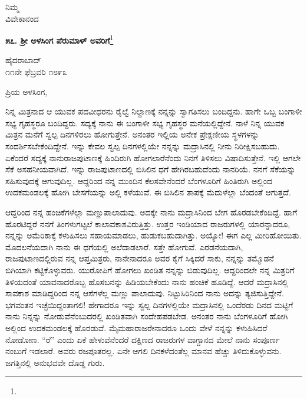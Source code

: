 \vspace{-0.45cm}

{\flushright
ನಿಮ್ಮ\\ವಿವೇಕಾನಂದ\par}

\begin{center}
\textbf{೫೭. ಶ‍್ರೀ ಅಳಸಿಂಗ ಪೆರುಮಾಳ್ ಅವರಿಗೆ}\footnote{}
\end{center}

\vspace{-0.45cm}

\begin{flushright}
ಹೈದರಾಬಾದ್\\೧೧ನೇ ಫೆಬ್ರವರಿ ೧೮೯೩
\end{flushright}

\noindent
ಪ್ರಿಯ ಅಳಸಿಂಗ,

ನಿನ್ನ ಮಿತ್ರನಾದ ಆ ಯುವಕ ಪದವೀಧರನು ರೈಲ್ವೆ ನಿಲ್ದಾಣಕ್ಕೆ ನನ್ನನ್ನು ಸ್ವಾಗತಿಸಲು ಬಂದಿದ್ದನು. ಹಾಗೇ ಒಬ್ಬ ಬಂಗಾಳೀ ಸಭ್ಯ ಗೃಹಸ್ಥರೂ ಬಂದಿದ್ದರು. ಸದ್ಯಕ್ಕೆ ನಾನು ಈ ಬಂಗಾಳೀ ಸಭ್ಯ ಗೃಹಸ್ಥರ ಮನೆಯಲ್ಲಿದ್ದೇನೆ. ನಾಳೆ ನಿನ್ನ ಯುವಕ ಮಿತ್ರನ ಮನೆಗೆ ಸ್ವಲ್ಪ ದಿನಗಳಿರಲು ಹೋಗುತ್ತೇನೆ. ಅನಂತರ ಇಲ್ಲಿಯ ಅನೇಕ ಪ್ರೇಕ್ಷಣೀಯ ಸ್ಥಳಗಳನ್ನು ಸಂದರ್ಶಿಸಬೇಕೆಂದಿದ್ದೇನೆ. ಇನ್ನು ಕೇವಲ ಸ್ವಲ್ಪ ದಿನಗಳಲ್ಲಿಯೇ ನನ್ನನ್ನು ಮದ್ರಾಸಿನಲ್ಲಿ ನೀನು ನಿರೀಕ್ಷಿಸಬಹುದು. ಏಕೆಂದರೆ ಸದ್ಯಕ್ಕೆ ನಾನುರಾಜಪುಟಾಣಕ್ಕೆ ಹಿಂದಿರುಗಿ ಹೋಗಲಾರೆನೆಂದು ನಿನಗೆ ತಿಳಿಸಲು ವಿಷಾದಿಸುತ್ತೇನೆ. ಇಲ್ಲಿ ಆಗಲೇ ಸೆಕೆ ಅಸಹನೀಯವಾಗಿದೆ. ಇನ್ನು ರಾಜಪುಟಾಣದಲ್ಲಿ ಬಿಸಿಲಿನ ಧಗೆ ಹೇಗಿರಬಹುದೆಂದು ನಾನರಿಯೆ. ನನಗೆ ಸೆಕೆಯನ್ನು ಸಹಿಸುವುದಕ್ಕೆ ಆಗುವುದಿಲ್ಲ. ಆದ್ದರಿಂದ ನನ್ನ ಮುಂದಿನ ಕೆಲಸವೇನೆಂದರೆ ಬೆಂಗಳೂರಿಗೆ ಹಿಂತಿರುಗಿ ಅಲ್ಲಿಂದ ಉದಕಮಂಡಲಕ್ಕೆ ಹೋಗಿ ಬೇಸಗೆಯನ್ನು ಅಲ್ಲಿ ಕಳೆಯುವೆ. ಈ ಬಿಸಿಲಿನ ತಾಪಕ್ಕೆ ಮೆದುಳೆಲ್ಲಾ ಬೆಂದಂತೆ ಆಗುತ್ತದೆ.

ಆದ್ದರಿಂದ ನನ್ನ ಹಂಚಿಕೆಗಳೆಲ್ಲಾ ಮಣ್ಣುಪಾಲಾದುವು. ಅದಕ್ಕೇ ನಾನು ಮದ್ರಾಸಿನಿಂದ ಬೇಗ ಹೊರಡಬೇಕೆಂದಿದ್ದೆ. ಹಾಗೆ ಹೊರಟಿದ್ದರೆ ನನಗೆ ತಿಂಗಳುಗಟ್ಟಲೆ ಕಾಲಾವಕಾಶವಿರುತ್ತಿತ್ತು. ಉತ್ತರ ಇಂಡಿಯಾದ ರಾಜರುಗಳಲ್ಲಿ ಯಾರನ್ನಾದರೂ, ನನ್ನನ್ನು ಅಮೆರಿಕಾಕ್ಕೆ ಕಳುಹಿಸಲು ಸಹಾಯಮಾಡಲು, ಹುಡುಕಬಹುದಾಗಿತ್ತು. ಅಯ್ಯೋ! ಈಗ ಎಲ್ಲ ಮೀರಿಹೋಯಿತು. ಮೊದಲನೆಯದಾಗಿ ನಾನು ಈ ಧಗೆಯಲ್ಲಿ ಅಲೆದಾಡಲಾರೆ. ಸತ್ತೇ ಹೋಗುವೆ. ಎರಡನೆಯದಾಗಿ, ರಾಜಪುಟಾಣದಲ್ಲಿರುವ ನನ್ನ ಆಪ್ತಮಿತ್ರರು, ನಾನೇನಾದರೂ ಅವರ ಕೈಗೆ ಸಿಕ್ಕಿದರೆ ಸಾಕು, ನನ್ನನ್ನು ತಮ್ಮೊಡನೆ ಬಿಗಿಯಾಗಿ ಕಟ್ಟಿಕೊಳ್ಳುವರು. ಯುರೋಪಿಗೆ ಹೋಗಲು ಖಂಡಿತ ನನ್ನನ್ನು ಬಿಡುವುದಿಲ್ಲ. ಆದ್ದರಿಂದಲೇ ನನ್ನ ಮಿತ್ರರಿಗೆ ತಿಳಿಯದಂತೆ ಯಾವನಾದರೊಬ್ಬ ಹೊಸಬನನ್ನು ಹಿಡಿಯಬೇಕೆಂದು ನಾನು ಹಂಚಿಕೆ ಹೂಡಿದ್ದೆ. ಆದರೆ ಮದ್ರಾಸಿನಲ್ಲಿ ಸಾವಕಾಶ ಮಾಡಿದ್ದರಿಂದ ನನ್ನ ಆಸೆಗಳೆಲ್ಲ ಮಣ್ಣು ಪಾಲಾದುವು. ನಿಟ್ಟುಸಿರಿನಿಂದ ನಾನು ಅದನ್ನು ತ್ಯಜಿಸುತ್ತಿದ್ದೇನೆ. ಭಗವಂತನ ಇಚ್ಛೆಯಿದ್ದಂತಾಗಲಿ! ಹೇಗಾದರೂ ಇನ್ನು ಸ್ವಲ್ಪ ದಿನಗಳಲ್ಲಿಯೇ ಮದ್ರಾಸಿನಲ್ಲಿ ಒಂದೆರಡು ದಿನದ ಮಟ್ಟಿಗೆ ನಾನು ನಿನ್ನನ್ನು ನೋಡುವೆನೆಂಬುದರಲ್ಲಿ ಖಂಡಿತವಾಗಿ ಸಂದೇಹಪಡಬೇಡ. ಅನಂತರ ನಾನು ಬೆಂಗಳೂರಿಗೆ ಹೋಗಿ ಅಲ್ಲಿಂದ ಉದಕಮಂಡಲಕ್ಕೆ ಹೊರಡುವೆ. ಮೈ\enginline{-}ಮಹಾರಾಜರೇನಾದರೂ ಒಂದು ವೇಳೆ ನನ್ನನ್ನು ಕಳುಹಿಸಿದರೆ ನೋಡೋಣ. “ರೆ” ಎಂದು ಏಕೆ ಹೇಳುವೆನೆಂದರೆ ದಕ್ಷಿಣದ ರಾಜರುಗಳ ವಾಗ್ದಾನದ ಮೇಲೆ ನಾನು ಸಂಪೂರ್ಣ ನಂಬುಗೆ ಇಡಲಾರೆ. ಅವರು ರಜಪೂತರಲ್ಲ. ಏನೇ ಆಗಲಿ ದಿನಕಳೆದಂತೆಲ್ಲ ಮಾನವ ಹೆಚ್ಚು ತಿಳಿದುಕೊಳ್ಳುವನು. ಜಗತ್ತಿನಲ್ಲಿ ಅನುಭವವೇ ದೊಡ್ಡ ಗುರು.

